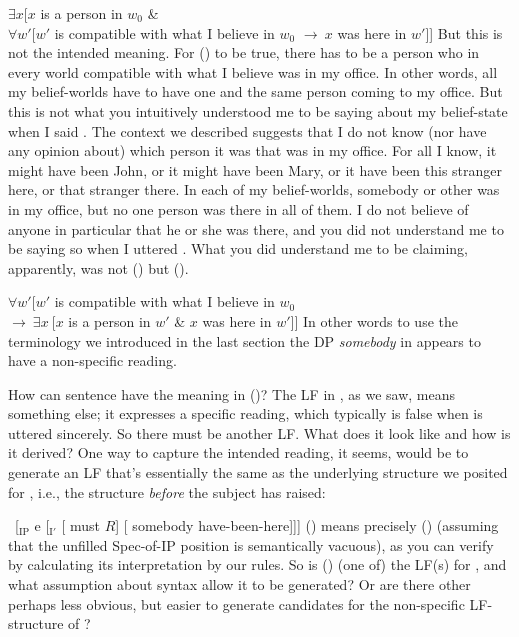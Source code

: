 \ex $\exists x [x$ is a person in $w_{0}$ \& \\
$\forall w'[w'$ is compatible with what I believe in $w_{0}$ $\rightarrow\ x$ was here in $w'$]] \xe
%
But this is not the intended meaning. For (\lastx) to be true, there has to be a
person who in every world compatible with what I believe was in my office. In
other words, all my belief-worlds have to have one and the same person coming to
my office. But this is not what you intuitively understood me to be saying about
my belief-state when I said . The context we described suggests that I
do not know (nor have any opinion about) which person it was that was in my
office. For all I know, it might have been John, or it might have been Mary, or
it have been this stranger here, or that stranger there. In each of my
belief-worlds, somebody or other was in my office, but no one person was there
in all of them. I do not believe of anyone in particular that he or she was
there, and you did not understand me to be saying so when I uttered .
What you did understand me to be claiming, apparently, was not (\lastx) but
(\nextx).

\ex \label{dedic} $\forall w' [ w'$ is compatible with what I believe in $w_{0}$\\
\null\hfill$\rightarrow\ \exists x\ [x$ is a person in $w'$ \& $x$ was here in $w']]$ \xe
%
In other words \dash to use the terminology we introduced in the last section
\dash the DP \emph{somebody} in  appears to have a non-specific
reading.

How can sentence  have the meaning in (\lastx)? The LF in
, as we saw, means something else; it expresses a specific reading,
which typically is false when  is uttered sincerely. So there must be
another LF. What does it look like and how is it derived? One way to capture the
intended reading, it seems, would be to generate an LF that's essentially the
same as the underlying structure we posited for , i.e., the structure
\emph{before} the subject has raised:

\ex\ [$_{\text{IP}}$ e [$_{\text{I}'}$ [ must $R$] [ somebody have-been-here]]] \xe
%
(\lastx) means precisely (\blastx) (assuming that the unfilled Spec-of-IP
position is semantically vacuous), as you can verify by calculating its
interpretation by our rules. So is (\lastx) (one of) the LF(s) for ,
and what assumption about syntax allow it to be generated? Or are there other
\dash perhaps less obvious, but easier to generate \dash candidates for the
non-specific LF-structure of ?

